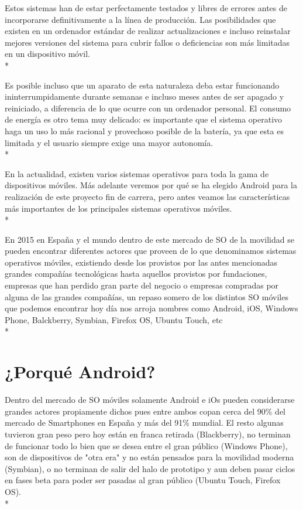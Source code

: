 \documentclass[../pfc.tex]{subfiles}
\begin{document}
	Estos sistemas han de estar perfectamente testados y libres de errores antes de incorporarse definitivamente a la línea de producción. Las posibilidades que existen en un ordenador estándar de realizar actualizaciones e incluso reinstalar mejores versiones del sistema para cubrir fallos o deficiencias son más limitadas en un dispositivo móvil.\\*
	
	Es posible incluso que un aparato de esta naturaleza deba estar funcionando ininterrumpidamente durante semanas e incluso meses antes de ser apagado y reiniciado, a diferencia de lo que ocurre con un ordenador personal. El consumo de energía es otro tema muy delicado: es importante que el sistema operativo haga un uso lo más racional y provechoso posible de la batería, ya que esta es limitada y el usuario siempre exige una mayor autonomía.\\*
	
	En la actualidad, existen varios sistemas operativos para toda la gama de dispositivos móviles. Más adelante veremos por qué se ha elegido Android para la realización de este proyecto fin de carrera, pero antes veamos las características más importantes de los principales sistemas operativos móviles.\\*
	
	En 2015 en España y el mundo dentro de este mercado de SO de la movilidad se pueden encontrar diferentes actores que proveen de lo que denominamos sistemas operativos móviles, existiendo desde los provistos por las antes mencionadas grandes compañías tecnológicas hasta aquellos provistos por fundaciones, empresas que han perdido gran parte del negocio o empresas compradas por alguna de las grandes compañías, un repaso somero de los distintos SO móviles que podemos encontrar hoy día nos arroja nombres como Android, iOS, Windows Phone, Balckberry, Symbian, Firefox OS, Ubuntu Touch, etc\\*
		
	\section{¿Porqué Android?}
	
	Dentro del mercado de SO móviles solamente Android e iOs pueden considerarse grandes actores propiamente dichos pues entre ambos copan cerca del 90\% del mercado de Smartphones en España y más del 91\% mundial\cite{usomundso}. El resto algunas tuvieron gran peso pero hoy están en franca retirada (Blackberry), no terminan de funcionar todo lo bien que se desea entre el gran público (Windows Phone), son de dispositivos de "otra era" y no están pensados para la movilidad moderna (Symbian), o no terminan de salir del halo de prototipo y aun deben pasar ciclos en fases beta para  poder ser pasadas al gran público (Ubuntu Touch, Firefox OS).\\*
	
\end{document}
